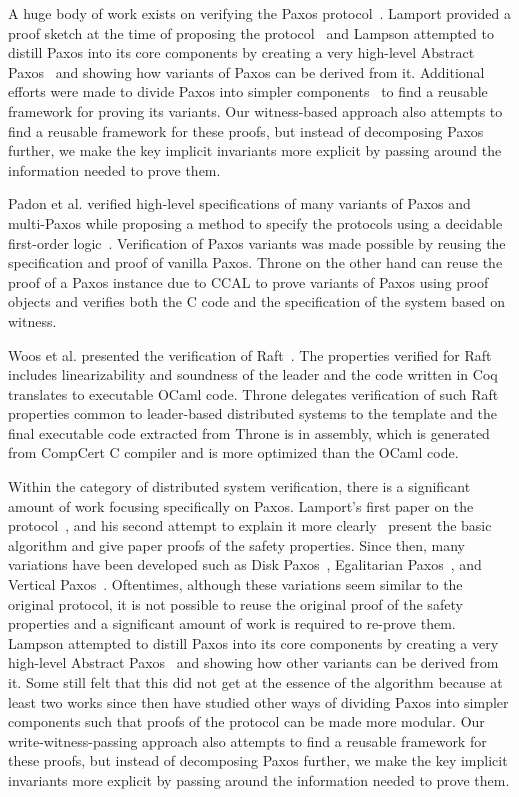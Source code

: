 A huge body of work exists on verifying the Paxos protocol~\cite{paxos}.
Lamport provided a proof sketch at the time of proposing the protocol~\cite{paxosmadesimple}
and Lampson attempted to distill Paxos into its core components by creating a very
high-level Abstract Paxos~\cite{Lampson2001} and showing how variants of
Paxos can be derived from it. Additional efforts were made to divide Paxos
into simpler components~\cite{dpaxos, sdpaxos} to find a reusable framework for
proving its variants. Our witness-based approach also attempts
to find a reusable framework for these proofs, but instead of decomposing Paxos
further, we make the key implicit invariants more explicit by passing around
the information needed to prove them.

Padon et al. verified high-level specifications of many variants of Paxos
and multi-Paxos while proposing a method to specify the protocols using
a decidable first-order logic~\cite{paxosepr}. Verification of Paxos
variants was made possible by reusing the specification and proof of vanilla
Paxos. Throne on the other hand can reuse the proof of a Paxos instance
due to CCAL to prove variants of Paxos using proof objects and verifies both the
C code and the specification of the system based on witness.


Woos et al. presented the verification of Raft~\cite{cppraft}. The properties
verified for Raft includes linearizability and soundness of the leader and
the code written in Coq translates to executable OCaml code. Throne
delegates verification of such Raft properties common to leader-based distributed
systems to the template and the final executable code extracted from
Throne is in assembly, which is generated from CompCert C compiler and is more
optimized than the OCaml code.


Within the category of distributed system verification, there is a significant amount of work focusing specifically on Paxos.
Lamport's first paper on the protocol~\cite{paxos}, and his second attempt to explain it more clearly~\cite{paxosmadesimple}
present the basic algorithm and give paper proofs of the safety properties.
Since then, many variations have been developed such as Disk Paxos~\cite{diskpaxos}, Egalitarian Paxos~\cite{epaxos},
and Vertical Paxos~\cite{vertpaxos}.
Oftentimes, although these variations seem similar to the original protocol, it is not possible to reuse the original
proof of the safety properties and a significant amount of work is required to re-prove them.
Lampson attempted to distill Paxos into its core components by creating a very high-level Abstract Paxos~\cite{Lampson2001}
and showing how other variants can be derived from it.
Some still felt that this did not get at the essence of the algorithm because at least two works since then \cite{dpaxos, sdpaxos}
have studied other ways of dividing Paxos into simpler components such that proofs of the protocol can be made more modular.
Our write-witness-passing approach also attempts to find a reusable framework for these proofs,
but instead of decomposing Paxos further, we make the key implicit invariants more explicit by passing around
the information needed to prove them.

